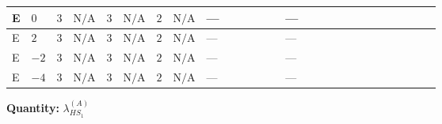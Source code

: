 \documentclass[8pt]{article}
\begin{document}
\begin{landscape}
\begin{longtable}{@{}llcccccc >{\raggedright\arraybackslash}p{0.21\linewidth} >{\raggedright\arraybackslash}p{0.21\linewidth} >{\raggedright\arraybackslash}p{0.21\linewidth}@{}}
\midrule
E & $0$ & $3$ & $\text{N/A}$ & $3$ & $\text{N/A}$ & $2$ & $\text{N/A}$ & --- & --- & \scriptsize\adjustbox{max width=\linewidth}{$\begin{gathered} {\lambda_{HS_1}^{(A)}} (6 \operatorname{Tr}\!\left({Y_d}\,\left({Y_d}\right)^{\dagger}\right)+2 \operatorname{Tr}\!\left({Y_e}\,\left({Y_e}\right)^{\dagger}\right)+6 \operatorname{Tr}\!\left({Y_u}\,\left({Y_u}\right)^{\dagger}\right)+16 {\lambda_{S_1}^{(A)}})\end{gathered}$} \\
\midrule
E & $2$ & $3$ & $\text{N/A}$ & $3$ & $\text{N/A}$ & $2$ & $\text{N/A}$ & --- & --- & \scriptsize\adjustbox{max width=\linewidth}{$\begin{gathered} {\lambda_{HS_1}^{(A)}} (6 \operatorname{Tr}\!\left({Y_d}\,\left({Y_d}\right)^{\dagger}\right)+2 \operatorname{Tr}\!\left({Y_e}\,\left({Y_e}\right)^{\dagger}\right)+6 \operatorname{Tr}\!\left({Y_u}\,\left({Y_u}\right)^{\dagger}\right)+16 {\lambda_{S_1}^{(A)}})\end{gathered}$} \\
\midrule
E & $-2$ & $3$ & $\text{N/A}$ & $3$ & $\text{N/A}$ & $2$ & $\text{N/A}$ & --- & --- & \scriptsize\adjustbox{max width=\linewidth}{$\begin{gathered} {\lambda_{HS_1}^{(A)}} (6 \operatorname{Tr}\!\left({Y_d}\,\left({Y_d}\right)^{\dagger}\right)+2 \operatorname{Tr}\!\left({Y_e}\,\left({Y_e}\right)^{\dagger}\right)+6 \operatorname{Tr}\!\left({Y_u}\,\left({Y_u}\right)^{\dagger}\right)+16 {\lambda_{S_1}^{(A)}})\end{gathered}$} \\
\midrule
E & $-4$ & $3$ & $\text{N/A}$ & $3$ & $\text{N/A}$ & $2$ & $\text{N/A}$ & --- & --- & \scriptsize\adjustbox{max width=\linewidth}{$\begin{gathered} {\lambda_{HS_1}^{(A)}} (6 \operatorname{Tr}\!\left({Y_d}\,\left({Y_d}\right)^{\dagger}\right)+2 \operatorname{Tr}\!\left({Y_e}\,\left({Y_e}\right)^{\dagger}\right)+6 \operatorname{Tr}\!\left({Y_u}\,\left({Y_u}\right)^{\dagger}\right)+16 {\lambda_{S_1}^{(A)}})\end{gathered}$} \\
\midrule
\bottomrule
\end{longtable}
\clearpage
\noindent\textbf{Quantity: }$\lambda_{HS_1}^{(A)}$\par\smallskip

\end{landscape}
\end{document}
